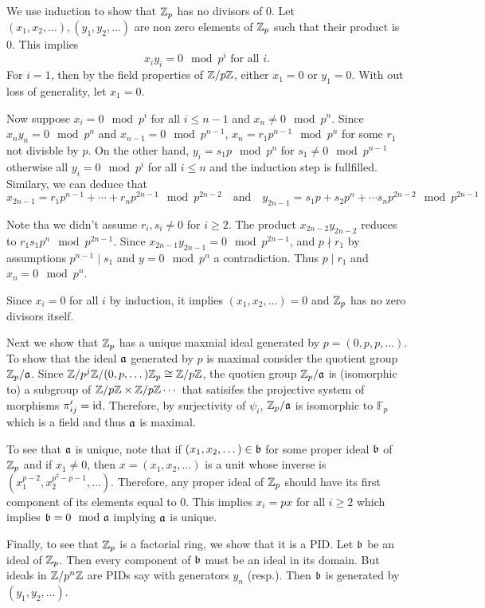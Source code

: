 \documentclass{article}
\theoremstyle{definition}
\theoremstyle{remark}
\begin{document}
\begin{enumerate}[(1)]
\begin{enumerate}[(a)]
                We use induction to show that $\mathbb{Z}_p$ has no divisors of 0. Let $(x_1, x_2, \dots), (y_1, y_2, \dots)$ are non zero elements of $\mathbb{Z}_p$ such that their product is $0$. This implies
                \[ x_iy_i = 0 \mod p^{i} \text{ for all } i.\]
                For $i = 1$, then by the field properties of $\mathbb{Z}/p\mathbb{Z}$, either $x_1 = 0$ or $y_1 = 0$. With out loss of generality, let $x_1 = 0$.

                Now suppose $x_i = 0 \mod p^{i}$ for all $i \leq n-1$ and $x_n \neq 0 \mod p^n$. Since $x_n y_n = 0 \mod p^n$ and $x_{n-1} = 0 \mod p^{n-1}$, $x_n = r_1p^{n-1} \mod p^n$ for some $r_1$ not divisble by $p$. On the other hand, $y_i = s_1p \mod p^n$ for $s_1 \neq 0 \mod p^{n-1}$ otherwise all $y_i = 0 \mod p^i$ for all $i \leq n$ and the induction step is fullfilled. Similary, we can deduce that
                \[ x_{2n-1} = r_1p^{n-1} + \cdots + r_np^{2n-1} \mod p^{2n-2} \quad \text{and} \quad  y_{2n-1} = s_1p + s_2p^{n} + \cdots s_np^{2n-2} \mod p^{2n- 1} \]

                Note tha we didn't assume $r_i, s_i \neq 0$ for $i \geq 2$. The product $x_{2n-2}y_{2n-2}$ reduces to $r_1s_1p^{n} \mod p^{2n-1}$. Since $x_{2n-1}y_{2n-1} = 0 \mod p^{2n-1}$,
                and $p \nmid r_1$ by assumptions $p^{n-1}\mid s_1$ and $y = 0 \mod p^{n}$ a contradiction. Thus $p \mid r_1$ and $x_n = 0 \mod p^n$.

                Since $x_i = 0$ for all $i$ by induction, it implies $(x_1, x_2, \dots) = 0$ and $\mathbb{Z}_p$ has no zero divisors itself.

                Next we show that $\mathbb{Z}_p$ has a unique maxmial ideal generated by $p = (0, p, p, \dots)$. To show that the ideal $\mathfrak{a}$ generated by $p$ is maximal consider the quotient group $\mathbb{Z}_p /\mathfrak{a}$. Since $\mathbb{Z}/p^j\mathbb{Z} / (0, p, \dots)\mathbb{Z}_p \cong \mathbb{Z}/p\mathbb{Z}$, the quotien group $\mathbb{Z}_p/\mathfrak{a}$ is (isomorphic to) a subgroup of $\mathbb{Z}/p\mathbb{Z} \times \mathbb{Z}/p\mathbb{Z} \cdots$ that satisifes the projective system of morphisms $\pi'_{ij} = \text{id}$. Therefore, by surjectivity of $\psi_i$,  $\mathbb{Z}_p/\mathfrak{a}$ is isomorphic to $\mathbb F_p$ which is a field and thus $\mathfrak{a}$ is maximal.

                To see that $\mathfrak{a}$ is unique, note that if $(x_1, x_2, \dots) \in \mathfrak{b}$ for some proper ideal $\mathfrak{b}$ of $\mathbb{Z}_p$ and if $x_1 \neq 0$, then $x = (x_1, x_2, \dots)$ is a unit whose inverse is $(x_1^{p-2}, x_2^{p^2-p-1}, \dots )$. Therefore, any proper ideal of $\mathbb{Z}_p$ should have its first component of its elements equal to $0$. This implies $x_i = px$ for all $i \geq 2$ which implies $\mathfrak{b} = 0 \mod {\mathfrak{a}}$ implying $\mathfrak{a}$ is unique.

                Finally, to see that $\mathbb{Z}_p$ is a factorial ring, we show that it is a PID. Let $\mathfrak{b}$ be an ideal of $\mathbb{Z}_p$. Then every component of $\mathfrak{b}$ must be an ideal in its domain. But ideals in $\mathbb{Z}/p^n\mathbb{Z}$ are PIDs say with generators $y_n$ (resp.). Then $\mathfrak{b}$ is generated by $(y_1, y_2, \dots)$.






        \end{enumerate}
\end{enumerate}
\end{document}
